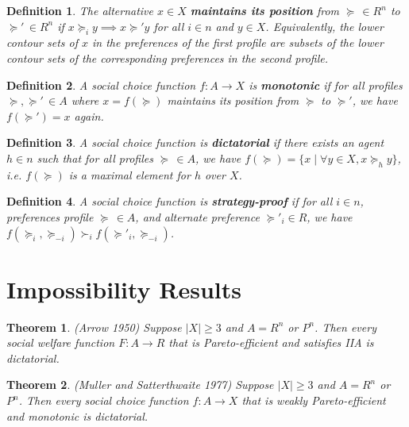 \documentclass[letter, 10pt]{article}
\theoremstyle{basic}
\newtheorem{definition}{Definition}[section]
\newtheorem{theorem}{Theorem}[section]
\begin{document}
\begin{spacing}{1.0}
\begin{definition}
  The alternative $x\in X$ \textbf{maintains its
    position} from $\succeq\,\in R^n$ to $\succeq' \,\in
  R^n$ if $x \succeq_i y \implies x \succeq' y$ for all
  $i\in n$ and $y \in X$. Equivalently, the lower contour
  sets of $x$ in the preferences of the first profile are
  subsets of the lower contour sets of the corresponding
  preferences in the second profile.
\end{definition}

\begin{definition}
  A social choice function $f: A \to X$ is
  \textbf{monotonic} if for all profiles $\succeq,
  \succeq'\,\in A$ where $x = f(\succeq)$ maintains its
  position from $\succeq$ to $\succeq'$, we have
  $f(\succeq')=x$ again.
\end{definition}

\begin{definition}
  A social choice function is \textbf{dictatorial} if
  there exists an agent $h\in n$ such that for all
  profiles $\succeq \,\in A$, we have $f(\succeq) =
  \{x\;|\; \forall y\in X, x\succeq_h y\}$,
  i.e. $f(\succeq)$ is a maximal element for $h$ over $X$.
\end{definition}

\begin{definition}
  A social choice function is \textbf{strategy-proof} if
  for all $i\in n$, preferences profile $\succeq\,\in A$,
  and alternate preference $\succeq'_i \in R$, we have
  $f(\succeq_i, \succeq_{-i}) \succ_i f(\succeq'_i, \succeq_{-i})$.
\end{definition}

\section{Impossibility Results}

\begin{theorem}
  (Arrow 1950) Suppose $|X| \geq 3$ and $A = R^n$ or
  $P^n$. Then every social welfare function $F:A\to R$
  that is Pareto-efficient and satisfies IIA is dictatorial.
\end{theorem}

\begin{theorem}
  (Muller and Satterthwaite 1977) Suppose $|X| \geq 3$
  and $A = R^n$ or $P^n$. Then every social choice
  function $f:A \to X$ that is weakly Pareto-efficient
  and monotonic is dictatorial.
\end{theorem}


\end{spacing}
\end{document}
